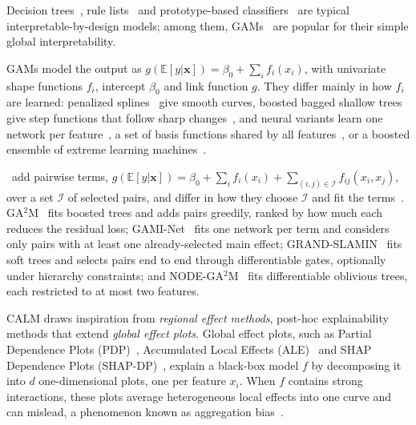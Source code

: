 Decision trees~\cite{breiman1984cart}, rule lists~\cite{letham2015stroke, angelino2018learningcertifiablyoptimalrule} and prototype-based classifiers~\cite{chen2019looks, bien2012prototype} are typical interpretable-by-design models; among them, GAMs~\cite{hastie1990generalized, wood2017generalized} are popular for their simple global interpretability.

GAMs model the output as $g(\mathbb{E}[y|\mathbf{x}]) = \beta_0 + \sum_{i} f_i(x_i)$, with univariate shape functions $f_i$, intercept $\beta_0$ and link function $g$.
They differ mainly in how $f_i$ are learned: penalized splines~\cite{wood2017generalized} give smooth curves, boosted bagged shallow trees~\cite{lou2012intelligible, nori2019interpretml} give step functions that follow sharp changes~\cite{chang2021interpretable}, and neural variants learn one network per feature~\cite{agarwal2021neural}, a set of basis functions shared by all features~\cite{radenovic2022neural}, or a boosted ensemble of extreme learning machines~\cite{KRAUS2024IGANN}.

\gamms~add pairwise terms, $g(\mathbb{E}[y|\mathbf{x}]) = \beta_0 + \sum_{i} f_i(x_i) + \sum_{(i,j)\in\mathcal{I}} f_{ij}(x_i, x_j)$, over a set $\mathcal{I}$ of selected pairs, and differ in how they choose $\mathcal{I}$ and fit the terms~\cite{tsang2018detecting, hu2022using}.
GA$^2$M~\cite{lou2013accurate} fits boosted trees and adds pairs greedily, ranked by how much each reduces the residual loss;
GAMI-Net~\cite{yang2020gami} fits one network per term and considers only pairs with at least one already-selected main effect;
GRAND-SLAMIN~\cite{ibrahim2023grandslamin} fits soft trees and selects pairs end to end through differentiable gates, optionally under hierarchy constraints;
and NODE-GA$^2$M~\cite{chang2022node} fits differentiable oblivious trees, each restricted to at most two features.

CALM draws inspiration from \emph{regional effect methods}, post-hoc explainability methods that extend \emph{global effect plots}.
Global effect plots, such as Partial Dependence Plots (PDP)~\cite{friedman2001greedy}, Accumulated Local Effects (ALE)~\cite{apley2020visualizing} and SHAP Dependence Plots (SHAP-DP)~\cite{lundberg2020local}, explain a black-box model $f$ by decomposing it into $d$ one-dimensional plots, one per feature $x_i$.
When $f$ contains strong interactions, these plots average heterogeneous local effects into one curve and can mislead, a phenomenon known as aggregation bias~\cite{mehrabi2021survey, herbinger2022REPID, baniecki2024robustness, gkolemis2023rhale, goldstein2015peeking, molnar2022general}.

